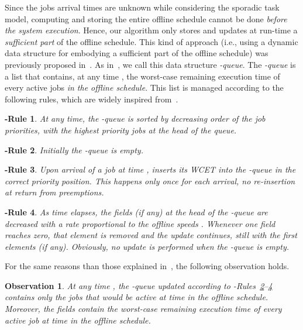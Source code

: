 \documentclass[times, 10pt,twocolumn]{article}
\newtheorem{ARule}{-Rule}
\newtheorem{Observation}{Observation}
\begin{document}

Since the jobs arrival times are unknown while considering the sporadic task model, computing and storing the entire offline schedule cannot be done \emph{before the system execution}. Hence, our algorithm only stores and updates at run-time a \emph{sufficient part} of the offline schedule. This kind of approach (i.e., using a dynamic data structure for embodying a sufficient part of the offline schedule) was previously proposed in~\cite{AyMeMoMe:04}. As in~\cite{AyMeMoMe:04}, we call this data structure \emph{-queue}. The \emph{-queue} is a list that contains, at any time , the worst-case remaining execution time  of every active jobs  \emph{in the offline schedule}. This list is managed according to the following rules, which are widely inspired from~\cite{AyMeMoMe:04}.

\begin{ARule}
\label{arule:1}
At any time, the -queue is sorted by decreasing order of the job priorities, with the  highest priority jobs at the head of the queue.
\end{ARule}

\begin{ARule}
\label{arule:2}
Initially the -queue is empty. 
\end{ARule}

\begin{ARule}
\label{arule:3}
Upon arrival of a job  at time ,  inserts its WCET  into the -queue in the correct priority position. This happens only once for each arrival, no re-insertion at return from preemptions. 
\end{ARule}

\begin{ARule}
\label{arule:4}
As time elapses, the  fields  (if any) at the head of the -queue are decreased with a rate proportional to the offline speeds . Whenever one field reaches zero, that element is removed and the update continues, still with the  first elements (if any). Obviously, no update is performed when the -queue is empty.
\end{ARule}

For the same reasons than those explained in~\cite{AyMeMoMe:04}, the following observation holds.
\begin{Observation}
\label{obs:1}
At any time , the -queue updated according to -Rules~\ref{arule:2}--\ref{arule:4} contains only the jobs that would be active at time  in the offline schedule. Moreover, the  fields contain the worst-case remaining execution time of every active job  at time  in the offline schedule.
\end{Observation}
\end{document}
